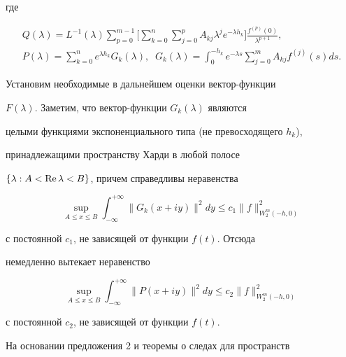 где


\begin{gather*}


Q(\lambda)=L^{-1}(\lambda)\sum\limits_{p=0}^{m-1}\bigg[


\sum\limits_{k=0}^n\sum\limits_{j=0}^pA_{kj}\lambda^je^{-\lambda h_k}\bigg]


\frac{f^{(p)}(0)}{\lambda^{p+1}},\\


%


P(\lambda)=\sum\limits_{k=0}^ne^{\lambda h_k}G_k(\lambda),\;\;


G_k(\lambda)=\int_0^{-h_k}


e^{-\lambda s}\sum\limits_{j=0}^mA_{kj}f^{(j)}(s)ds.


\end{gather*}





Установим необходимые в дальнейшем оценки вектор-функции


$F(\lambda)$. Заметим, что вектор-функции $G_k(\lambda)$ являются


целыми функциями экспоненциального типа (не превосходящего $h_k$),


принадлежащими пространству Харди в любой полосе


$\{\lambda:A<\operatorname{Re}\lambda<B\}$, причем справедливы неравенства


$$




\sup\limits_{A\le x\le B}\int_{-\infty}^{+\infty}\|G_k(x+iy)\|^2dy


\le c_1\|f\|_{W_2^m(-h,0)}^2


$$


с постоянной $c_1$, не зависящей от функции $f(t)$. Отсюда


немедленно вытекает неравенство


\begin{equation}


\label{i}


\sup\limits_{A\le x\le B}\int_{-\infty}^{+\infty}\|P(x+iy)\|^2dy


\le c_2\|f\|_{W_2^m(-h,0)}^2


\end{equation}


с постоянной $c_2$, не зависящей от функции $f(t)$.





На основании предложения 2 и теоремы о следах для пространств


